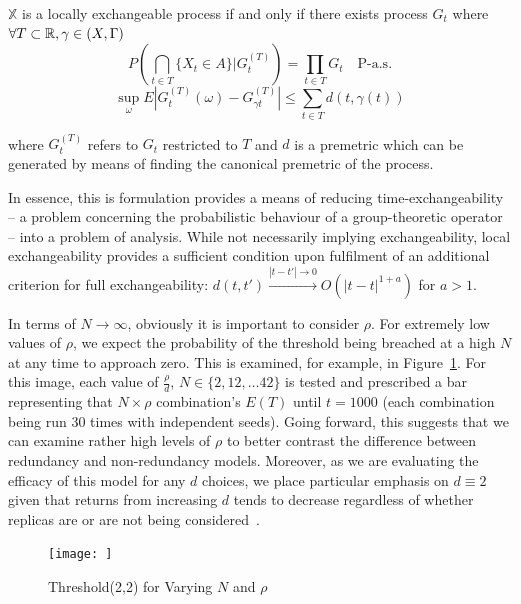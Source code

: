 \begin{definition}
    $\mathbb{X}$ is a locally exchangeable process if and only if there exists process $G_{t}$ where $\forall T \subset \mathbb{R}, \gamma \in \text(X,\Gamma) $
    \[P\left(\bigcap_{t \in T} \{X_{t} \in A\} | G^{(T)}_{t} \right) = \prod_{t \in T} G_{t} \quad \text{P-a.s.}\]
    \[\sup_{\omega}E|G^{(T)}_{t} (\omega)-G^{(T)}_{\gamma t}| \leq \sum_{t \in T} d(t, \gamma(t))\]

    where $G^{(T)}_{t}$ refers to $G_{t}$ restricted to $T$ and $d$ is a premetric which can be generated by means of finding the canonical premetric of the process.
\end{definition}
In essence, this is formulation provides a means of reducing time-exchangeability -- a problem concerning the probabilistic behaviour of a group-theoretic operator -- into a problem of analysis. While not necessarily implying exchangeability, local exchangeability provides a sufficient condition upon fulfilment of an additional criterion for full exchangeability: $d(t,t') \overset{|t-t'|\rightarrow 0}\rightarrow O(|t-t|^{1+a})$ for $a>1$.

In terms of $N \rightarrow \infty$, obviously it is important to consider $\rho$. For extremely low values of $\rho$, we expect the probability of the threshold being breached at a high $N$ at any time to approach zero. This is examined, for example, in Figure~\ref{fig:img1}. For this image, each value of $\frac{\rho}{d}$, $N \in \{2, 12, \dots 42\}$ is tested and prescribed a bar representing that $N \times \rho$ combination's $E(T)$ until $t=1000$ (each combination being run 30 times with independent seeds). Going forward, this suggests that we can examine rather high levels of $\rho$ to better contrast the difference between redundancy and non-redundancy models. Moreover, as we are evaluating the efficacy of this model for any $d$ choices, we place particular emphasis on $d \equiv 2$ given that returns from increasing $d$ tends to decrease regardless of whether replicas are or are not being considered~\cite{gardner_redundancy-d_2017,power}.
\begin{figure}
    \centering
    \texttt{[image: ]} %
    \caption{Threshold(2,2) for Varying $N$ and $\rho$}
    \label{fig:img1}
\end{figure}

